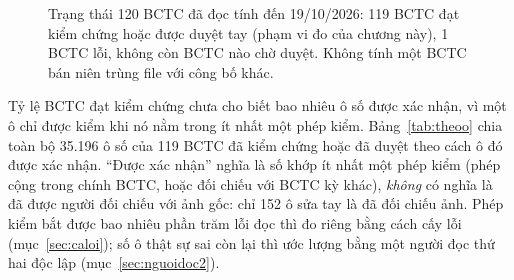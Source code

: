 \documentclass[12pt,a4paper]{report}
\newcommand{\enquote}[1]{“#1”}
\begin{document}
\begin{figure}[tbp]
\centering
{}
\caption{Trạng thái 120 BCTC đã đọc tính đến 19/10/2026: 119 BCTC đạt kiểm chứng hoặc được duyệt tay (phạm vi đo của
chương này), 1 BCTC lỗi, không còn BCTC nào chờ duyệt. Không tính một BCTC bán niên trùng file với công bố
khác.}\label{fig:trangthaiketqua}
\end{figure}

Tỷ lệ BCTC đạt kiểm chứng chưa cho biết bao nhiêu ô số được xác nhận, vì một ô chỉ được kiểm khi nó nằm trong ít nhất
một phép kiểm. Bảng~\ref{tab:theoo} chia toàn bộ 35.196 ô số của 119 BCTC đã kiểm chứng hoặc đã duyệt theo cách ô đó được
xác nhận. \enquote{Được xác nhận} nghĩa là số khớp ít nhất một phép kiểm (phép cộng trong chính BCTC, hoặc đối chiếu với
BCTC kỳ khác), \emph{không} có nghĩa là đã được người đối chiếu với ảnh gốc: chỉ 152 ô sửa tay là đã đối chiếu ảnh. Phép
kiểm bắt được bao nhiêu phần trăm lỗi đọc thì đo riêng bằng cách cấy lỗi (mục~\ref{sec:caloi}); số ô thật sự sai còn lại
thì ước lượng bằng một người đọc thứ hai độc lập (mục~\ref{sec:nguoidoc2}).
\end{document}
